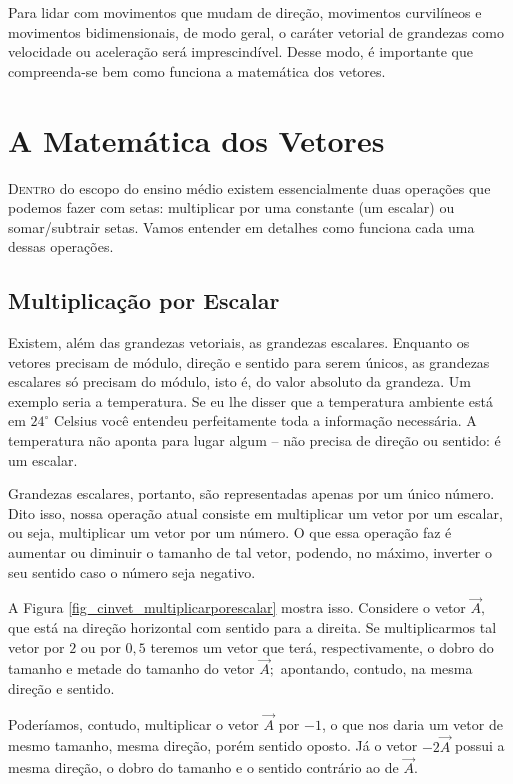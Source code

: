 Para lidar com movimentos que mudam de direção, movimentos curvilíneos e movimentos bidimensionais, de modo geral, o caráter vetorial de grandezas como velocidade ou aceleração será imprescindível. Desse modo, é importante que compreenda-se bem como funciona a matemática dos vetores.



\section{A Matemática dos Vetores}

\lettrine{D}{entro} do escopo do ensino médio existem essencialmente duas operações que podemos fazer com setas: multiplicar por uma constante (um escalar) ou somar/subtrair setas. Vamos entender em detalhes como funciona cada uma dessas operações.


\subsection{Multiplicação por Escalar}

Existem, além das grandezas vetoriais, as grandezas escalares. Enquanto os vetores precisam de módulo, direção e sentido para serem únicos, as grandezas escalares só precisam do módulo, isto é, do valor absoluto da grandeza. Um exemplo seria a temperatura. Se eu lhe disser que a temperatura ambiente está em $24^\circ$ Celsius você entendeu perfeitamente toda a informação necessária. A temperatura não aponta para lugar algum -- não precisa de direção ou sentido: é um escalar.

Grandezas escalares, portanto, são representadas apenas por um único número. Dito isso, nossa operação atual consiste em multiplicar um vetor por um escalar, ou seja, multiplicar um vetor por um número. O que essa operação faz é aumentar ou diminuir o tamanho de tal vetor, podendo, no máximo, inverter o seu sentido caso o número seja negativo.

A Figura \ref{fig_cinvet_multiplicarporescalar} mostra isso. Considere o vetor $\vec{A},$ que está na direção horizontal com sentido para a direita. Se multiplicarmos tal vetor por $2$ ou por $0,5$ teremos um vetor que terá, respectivamente, o dobro do tamanho e metade do tamanho do vetor $\vec{A};$ apontando, contudo, na mesma direção e sentido.

Poderíamos, contudo, multiplicar o vetor $\vec{A}$ por $-1$, o que nos daria um vetor de mesmo tamanho, mesma direção, porém sentido oposto. Já o vetor $-2\vec{A}$ possui a mesma direção, o dobro do tamanho e o sentido contrário ao de $\vec{A}.$


